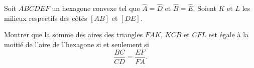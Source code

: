 \documentclass[varwidth]{standalone}
\begin{document}
    Soit $ABCDEF$ un hexagone convexe tel que $\hat{A} = \hat{D}$ et $\hat{B} = \hat{E}$. Soient $K$ et $L$ les milieux respectifs des c\^ot\'es $[AB]$ et $[DE]$.

    Montrer que la somme des aires des triangles $FAK$, $KCB$ et $CFL$ est \'egale \`a la moiti\'e de l'aire de l'hexagone si et seulement si
    \[
        \frac{BC}{CD} = \frac{EF}{FA}.  
    \]
\end{document}
